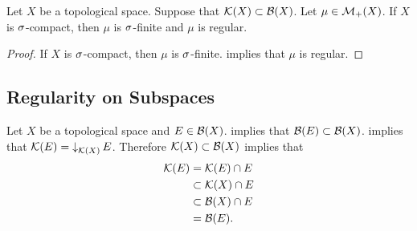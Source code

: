 \documentclass{book}
\begin{document}
	\begin{ex}  
		Let $X$ be a topological space. Suppose that $\mathcal{K}(X) \subset \mathcal{B}(X)$. Let $\mu \in \mathcal{M}_+(X)$. If $X$ is $\sigma$-compact, then $\mu$ is $\sigma$-finite and $\mu$ is regular.
	\end{ex}
	
	\begin{proof}
		If $X$ is $\sigma$-compact, then $\mu$ is $\sigma$-finite.  implies that $\mu$ is regular.
	\end{proof}
	
	
	
	







	



































	\subsection{Regularity on Subspaces}
	
	\begin{note} 
		Let $X$ be a topological space and $E \in \mathcal{B}(X)$.  implies that $\mathcal{B}(E) \subset \mathcal{B}(X)$.  implies that $\mathcal{K}(E) = \operatorname{\downarrow}_{\mathcal{K}(X)} E$. Therefore $\mathcal{K}(X) \subset \mathcal{B}(X)$ implies that 
		\begin{align*}
			\mathcal{K}(E) 
			& = \mathcal{K}(E) \cap E \\
			& \subset \mathcal{K}(X) \cap E \\
			& \subset \mathcal{B}(X) \cap E \\
			& = \mathcal{B}(E).
		\end{align*} 
	\end{note}
	
\end{document}
